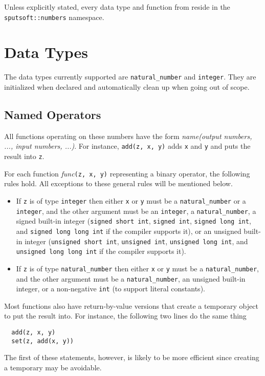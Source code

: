 \documentclass[a4paper]{article}
\begin{document}
Unless explicitly stated, every data type and function from reside in the \texttt{sputsoft::numbers} namespace.

\section{Data Types}

The data types currently supported are \texttt{natural\_number} and \texttt{integer}. They are initialized when declared and automatically clean up when going out of scope.

\subsection{Named Operators}

All functions operating on these numbers have the form \emph{name(output numbers, ..., input numbers, ...)}. For instance, \texttt{add(z, x, y)} adds \texttt{x} and \texttt{y} and puts the result into \texttt{z}.

For each function \emph{func}\texttt{(z, x, y)} representing a binary operator, the following rules hold. All exceptions to these general rules will be mentioned below.
\begin{itemize}
\item If \texttt{z} is of type \texttt{integer} then either \texttt{x} or \texttt{y} must be a \texttt{natural\_number} or a \texttt{integer}, and the other argument must be an \texttt{integer}, a \texttt{natural\_number}, a signed built-in integer (\texttt{signed short int}, \texttt{signed int}, \texttt{signed long int}, and \texttt{signed long long int} if the compiler supports it), or an unsigned built-in integer (\texttt{unsigned short int}, \texttt{unsigned int}, \texttt{unsigned long int}, and \texttt{unsigned long long int} if the compiler supports it).
\item If \texttt{z} is of type \texttt{natural\_number} then either \texttt{x} or \texttt{y} must be a \texttt{natural\_number}, and the other argument must be a \texttt{natural\_number}, an unsigned built-in integer, or a non-negative \texttt{int} (to support literal constants).
\end{itemize}

Most functions also have return-by-value versions that create a temporary object to put the result into. For instance, the following two lines do the same thing
\begin{verbatim}
  add(z, x, y)
  set(z, add(x, y))
\end{verbatim}
The first of these statements, however, is likely to be more efficient since creating a temporary may be avoidable.
\end{document}
